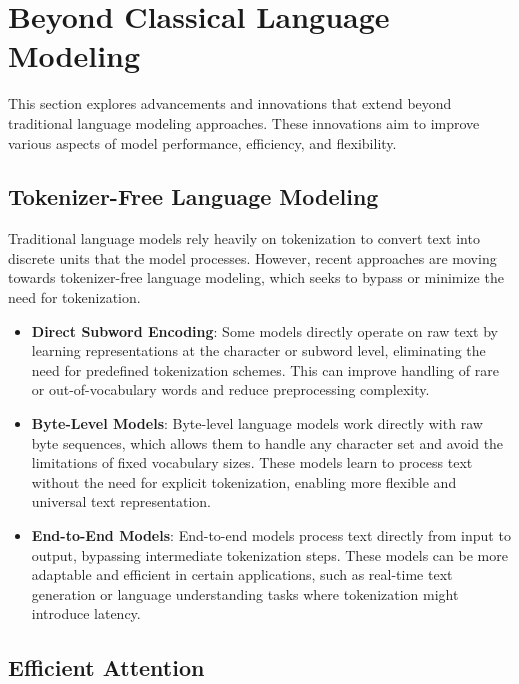 \section{Beyond Classical Language Modeling}

This section explores advancements and innovations that extend beyond traditional language modeling approaches. These innovations aim to improve various aspects of model performance, efficiency, and flexibility.

\subsection{Tokenizer-Free Language Modeling}

Traditional language models rely heavily on tokenization to convert text into discrete units that the model processes. However, recent approaches are moving towards tokenizer-free language modeling, which seeks to bypass or minimize the need for tokenization.

\begin{itemize}
    \item \textbf{Direct Subword Encoding}: Some models directly operate on raw text by learning representations at the character or subword level, eliminating the need for predefined tokenization schemes. This can improve handling of rare or out-of-vocabulary words and reduce preprocessing complexity.
    
    \item \textbf{Byte-Level Models}: Byte-level language models work directly with raw byte sequences, which allows them to handle any character set and avoid the limitations of fixed vocabulary sizes. These models learn to process text without the need for explicit tokenization, enabling more flexible and universal text representation.

    \item \textbf{End-to-End Models}: End-to-end models process text directly from input to output, bypassing intermediate tokenization steps. These models can be more adaptable and efficient in certain applications, such as real-time text generation or language understanding tasks where tokenization might introduce latency.

\end{itemize}

\subsection{Efficient Attention}

